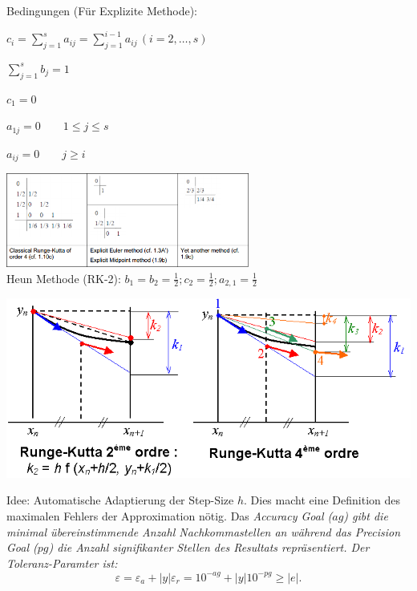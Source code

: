       \begin{minipage}{9cm}
        Bedingungen (Für Explizite Methode): 
        \begin{liste}
          \item $c_i = \sum\limits_{j=1}^s a_{ij} = \sum\limits_{j=1}^{i-1} a_{ij}\,(i=2,\ldots,s)$
          \item $\sum\limits_{j=1}^s b_j = 1$
          \item $c_1=0$
          \item $a_{1j} = 0 \qquad 1\leq j\leq s $
          \item $a_{ij} = 0 \qquad j\geq i$
        \end{liste}
        \includegraphics[width=8cm]{./bilder/ode_rungekutta_butcher_examples.png}\\
        Heun Methode (RK-2): $b_1 = b_2 = \frac{1}{2}; c_2=\frac{1}{2}; a_{2,1}=\frac{1}{2}$
      \end{minipage}
      
      \begin{center}
          \includegraphics[width=0.6\linewidth]{bilder/rungekutta.png}
      \end{center}
      
\newpage
      Idee: Automatische Adaptierung der Step-Size $h$. Dies macht eine Definition des maximalen 
      Fehlers der Approximation nötig. Das \em Accuracy Goal \em ($ag$) 
      gibt die minimal übereinstimmende Anzahl Nachkommastellen an während
      das \em Precision Goal \em ($pg$) die Anzahl signifikanter Stellen des Resultats repräsentiert. 
      Der Toleranz-Paramter ist:
      $$\varepsilon = \varepsilon_a+ |y|\varepsilon_r=10^{-ag} + |y| 10^{-pg} \geq |e|.$$
     
